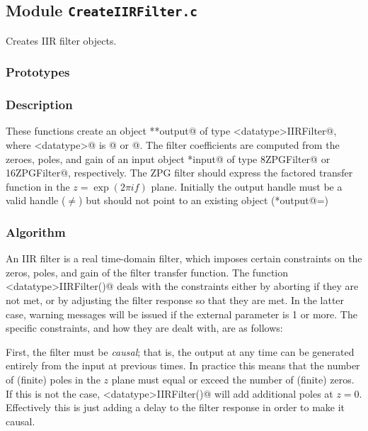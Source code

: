 
\subsection{Module \texttt{CreateIIRFilter.c}}

Creates IIR filter objects.

\subsubsection{Prototypes}
\vspace{0.1in}


\subsubsection{Description}

These functions create an object \verb@**output@ of type
\verb@<datatype>IIRFilter@, where \verb@<datatype>@ is @ or
@.  The filter coefficients are computed from the zeroes,
poles, and gain of an input object \verb@*input@ of type
\verb@COMPLEX8ZPGFilter@ or \verb@COMPLEX16ZPGFilter@, respectively.
The ZPG filter should express the factored transfer function in the
$z=\exp(2\pi if)$ plane.  Initially the output handle must be a valid
handle (\verb@output@$\neq$\verb@NULL@) but should not point to an
existing object (\verb@*output@=\verb@NULL@)

\subsubsection{Algorithm}

An IIR filter is a real time-domain filter, which imposes certain
constraints on the zeros, poles, and gain of the filter transfer
function.  The function \verb@Create<datatype>IIRFilter()@ deals with
the constraints either by aborting if they are not met, or by
adjusting the filter response so that they are met.  In the latter
case, warning messages will be issued if the external parameter
\verb@debuglevel@ is 1 or more.  The specific constraints, and how
they are dealt with, are as follows:

First, the filter must be \emph{causal}; that is, the output at any
time can be generated entirely from the input at previous times.  In
practice this means that the number of (finite) poles in the $z$ plane
must equal or exceed the number of (finite) zeros.  If this is not the
case, \verb@Create<datatype>IIRFilter()@ will add additional poles at
$z=0$.  Effectively this is just adding a delay to the filter response
in order to make it causal.

